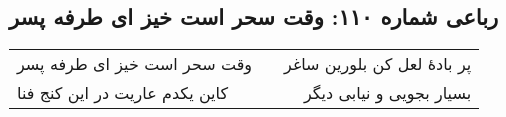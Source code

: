 \begin{center}
\section*{رباعی شماره ۱۱۰: وقت سحر است خیز ای طرفه پسر}
\label{sec:sh110}
\begin{longtable}{l p{0.5cm} r}
وقت سحر است خیز ای طرفه پسر
&&
پر بادهٔ لعل کن بلورین ساغر
\\
کاین یکدم عاریت در این کنج فنا
&&
بسیار بجویی و نیابی دیگر
\\
\end{longtable}
\end{center}
